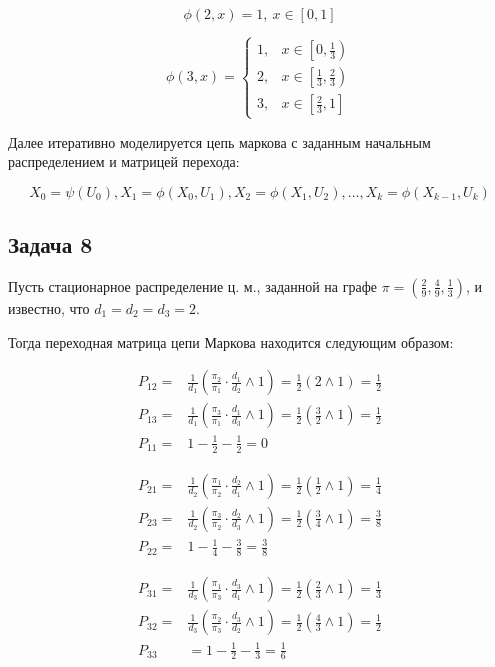 \documentclass[a4paper,12pt]{article} %
\begin{document}
$$\phi(2, x)= 1, \  x \in[0,1]  $$

$$\phi(3, x)=\left\{\begin{array}{ll}
1, & x \in\left[0, \frac{1}{3}\right) \\
2, & x \in\left[\frac{1}{3}, \frac{2}{3}\right) \\
3, & x \in\left[\frac{2}{3}, 1\right]
\end{array}\right.$$

Далее итеративно моделируется цепь маркова с заданным начальным распределением и  матрицей перехода:

$$X_{0}=\psi\left(U_{0}\right), X_{1}=\phi\left(X_{0}, U_{1}\right), X_{2}=\phi\left(X_{1}, U_{2}\right),  \dots, X_{k}=\phi\left(X_{k-1}, U_{k}\right)$$




\subsection*{Задача 8}

Пусть стационарное распределение ц. м., заданной на графе $\pi=\left(\frac{2}{9}, \frac{4}{9}, \frac{1}{3}\right)$, и известно, что $d_{1}=d_{2}=d_{3}=2$.

Тогда переходная матрица цепи Маркова находится следующим образом: 

$$\begin{aligned}
P_{12}=& \frac{1}{d_{1}}\left(\frac{\pi_{2}}{\pi_{1}} \cdot \frac{d_{1}}{d_{2}} \wedge  1\right)=\frac{1}{2}\left(2\wedge 1\right)=\frac{1}{2} \\
P_{13}=& \frac{1}{d_{1}}\left(\frac{\pi_{3}}{\pi_{1}} \cdot \frac{d_{1}}{d_{3}} \wedge 1\right)=\frac{1}{2}\left(\frac{3}{2}\wedge 1\right)=\frac{1}{2} \\ P_{11}=& 1-\frac{1}{2}-\frac{1}{2}=0
\end{aligned}$$


$$\begin{aligned}
P_{21}=& \frac{1}{d_{2}}\left(\frac{\pi_{1}}{\pi_{2}} \cdot \frac{d_{2}}{d_{1}} \wedge {1}\right)=\frac{1}{2}\left(\frac{1}{2} \wedge {1}\right)=\frac{1}{4} \\
P_{23}=& \frac{1}{d_{2}}\left(\frac{\pi_{3}}{\pi_{2}} \cdot \frac{d_{2}}{d_{3}} \wedge 1 \right)=\frac{1}{2}\left(\frac{3}{4} \wedge 1\right)=\frac{3}{8} \\
 P_{22}=&1-\frac{1}{4}-\frac{3}{8}=\frac{3}{8}
\end{aligned}$$


$$\begin{aligned}
P_{31}=& \frac{1}{d_{3}}\left(\frac{\pi_{1}}{\pi_{3}} \cdot \frac{d_{3}}{d_{1}}\wedge1\right)=\frac{1}{2}\left(\frac{2}{3}\wedge 1\right)=\frac{1}{3} \\
P_{32}=& \frac{1}{d_{3}}\left(\frac{\pi_{2}}{\pi_{3}} \cdot \frac{d_{3}}{d_{2}}\wedge1\right)=\frac{1}{2}\left(\frac{4}{3}\wedge 1\right)=\frac{1}{2} \\
  P_{33}&=1-\frac{1}{2}-\frac{1}{3}=\frac{1}{6}
\end{aligned}$$
\end{document}

